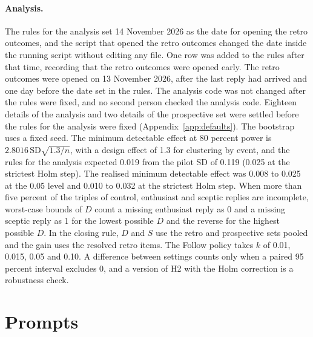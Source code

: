 \documentclass[11pt]{article}
\begin{document}
\paragraph{Analysis.}
The rules for the analysis set 14 November 2026 as the date for opening the retro outcomes, and the script that opened the retro outcomes changed the date inside the running script without editing any file. One row was added to the rules after that time, recording that the retro outcomes were opened early. The retro outcomes were opened on 13 November 2026, after the last reply had arrived and one day before the date set in the rules. The analysis code was not changed after the rules were fixed, and no second person checked the analysis code. Eighteen details of the analysis and two details of the prospective set were settled before the rules for the analysis were fixed (Appendix~\ref{app:defaults}). The bootstrap uses a fixed seed. The minimum detectable effect at 80 percent power is $2.8016\,\mathrm{SD}\sqrt{1.3/n}$, with a design effect of 1.3 for clustering by event, and the rules for the analysis expected 0.019 from the pilot SD of 0.119 (0.025 at the strictest Holm step). The realised minimum detectable effect was 0.008 to 0.025 at the 0.05 level and 0.010 to 0.032 at the strictest Holm step. When more than five percent of the triples of control, enthusiast and sceptic replies are incomplete, worst-case bounds of $D$ count a missing enthusiast reply as 0 and a missing sceptic reply as 1 for the lowest possible $D$ and the reverse for the highest possible $D$. In the closing rule, $D$ and $S$ use the retro and prospective sets pooled and the gain uses the resolved retro items. The Follow policy takes $k$ of 0.01, 0.015, 0.05 and 0.10. A difference between settings counts only when a paired 95 percent interval excludes 0, and a version of H2 with the Holm correction is a robustness check.

\section{Prompts}\label{app:prompt}
\end{document}
